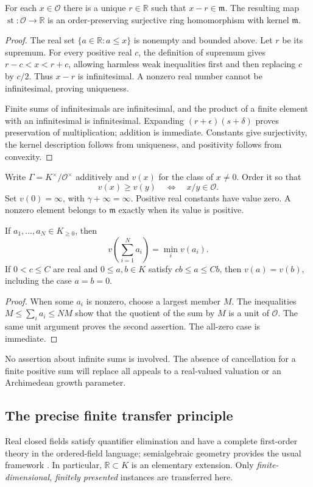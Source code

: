 \documentclass[11pt,a4paper]{article}
\numberwithin{equation}{section}
\theoremstyle{plain}
\newcommand{\R}{\mathbb R}
\newcommand{\st}{\operatorname{st}}
\newcommand{\OO}{\mathcal O}
\newcommand{\mm}{\mathfrak m}
\begin{document}
\begin{lemma}
\label{poly:mv:lem:standard}
For each $x\in\OO$ there is a unique $r\in\R$ such that $x-r\in\mm$.
The resulting map $\st:\OO\to\R$ is an order-preserving surjective ring
homomorphism with kernel $\mm$.
\end{lemma}
\begin{proof}
The real set $\{a\in\R:a\le x\}$ is nonempty and bounded above. Let $r$
be its supremum. For every positive real $c$, the definition of supremum
gives $r-c<x<r+c$, allowing harmless weak inequalities first and then
replacing $c$ by $c/2$. Thus $x-r$ is infinitesimal. A nonzero real number
cannot be infinitesimal, proving uniqueness.

Finite sums of infinitesimals are infinitesimal, and the product of a
finite element with an infinitesimal is infinitesimal. Expanding
$(r+\epsilon)(s+\delta)$ proves preservation of multiplication; addition
is immediate. Constants give surjectivity, the kernel description follows
from uniqueness, and positivity follows from convexity.
\end{proof}

Write $\Gamma=K^\times/\OO^\times$ additively and $v(x)$ for the class of
$x\ne0$. Order it so that
\[
 v(x)\ge v(y)\quad\Longleftrightarrow\quad x/y\in\OO.
\]
Set $v(0)=\infty$, with $\gamma+\infty=\infty$. Positive real constants
have value zero. A nonzero element belongs to $\mm$ exactly when its value
is positive.

\begin{lemma}
\label{poly:mv:lem:positive}
If $a_1,\ldots,a_N\in K_{\ge0}$, then
\[
 v\left(\sum_{i=1}^N a_i\right)=\min_i v(a_i).
\]
If $0<c\le C$ are real and $0\le a,b\in K$ satisfy $cb\le a\le Cb$,
then $v(a)=v(b)$, including the case $a=b=0$.
\end{lemma}
\begin{proof}
When some $a_i$ is nonzero, choose a largest member $M$. The inequalities
$M\le\sum_i a_i\le NM$ show that the quotient of the sum by $M$ is a
unit of $\OO$. The same unit argument proves the second assertion.
The all-zero case is immediate.
\end{proof}

No assertion about infinite sums is involved. The absence of cancellation
for a finite positive sum will replace all appeals to a real-valued
valuation or an Archimedean growth parameter.

\subsection{The precise finite transfer principle}
Real closed fields satisfy quantifier elimination and have a complete
first-order theory in the ordered-field language; semialgebraic geometry
provides the usual framework \cite{mv:Coste}. In particular, $\R\subset K$
is an elementary extension. Only \emph{finite-dimensional, finitely
presented} instances are transferred here.
\end{document}
